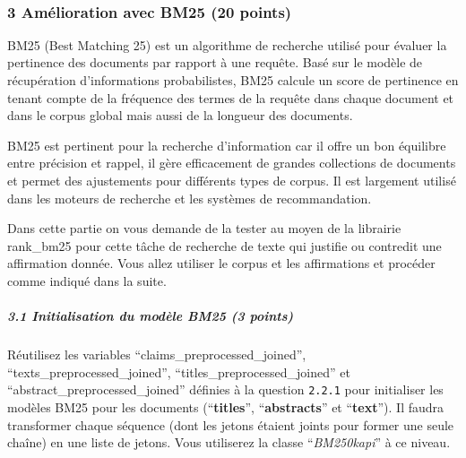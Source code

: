 \documentclass[11pt]{article}
\begin{document}
    \begin{center}
    \end{center}
    { \hspace*{\fill} \\}
    
    \subsubsection{3 Amélioration avec BM25 (20
points)}\label{amuxe9lioration-avec-bm25-20-points}

    BM25 (Best Matching 25) est un algorithme de recherche utilisé pour
évaluer la pertinence des documents par rapport à une requête. Basé sur
le modèle de récupération d'informations probabilistes, BM25 calcule un
score de pertinence en tenant compte de la fréquence des termes de la
requête dans chaque document et dans le corpus global mais aussi de la
longueur des documents.

BM25 est pertinent pour la recherche d'information car il offre un bon
équilibre entre précision et rappel, il gère efficacement de grandes
collections de documents et permet des ajustements pour différents types
de corpus. Il est largement utilisé dans les moteurs de recherche et les
systèmes de recommandation.

Dans cette partie on vous demande de la tester au moyen de la librairie
rank\_bm25 pour cette tâche de recherche de texte qui justifie ou
contredit une affirmation donnée. Vous allez utiliser le corpus et les
affirmations et procéder comme indiqué dans la suite.

    \subparagraph{3.1 Initialisation du modèle BM25 (3
points)}\label{initialisation-du-moduxe8le-bm25-3-points}

Réutilisez les variables ``claims\_preprocessed\_joined'',
``texts\_preprocessed\_joined'', ``titles\_preprocessed\_joined'' et
``abstract\_preprocessed\_joined'' définies à la question \texttt{2.2.1}
pour initialiser les modèles BM25 pour les documents
(``\textbf{titles}'', ``\textbf{abstracts}'' et ``\textbf{text}''). Il
faudra transformer chaque séquence (dont les jetons étaient joints pour
former une seule chaîne) en une liste de jetons. Vous utiliserez la
classe ``\emph{BM250kapi}'' à ce niveau.
\end{document}
